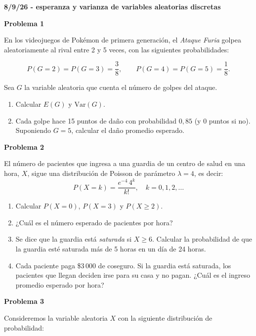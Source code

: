 \documentclass[12pt, a4paper]{article}
\begin{document}

\textbf{8/9/26 - esperanza y varianza de variables aleatorias discretas}

\textbf{Problema 1}

En los videojuegos de Pokémon de primera generación, el  \textit{Ataque Furia}
golpea aleatoriamente al rival entre 2 y 5 veces, con las siguientes probabilidades:

\[
  P(G = 2) = P(G = 3) = \frac{3}{8}, \qquad P(G = 4) = P(G = 5) = \frac{1}{8}.
\]

Sea $G$ la variable aleatoria que cuenta el número de golpes del ataque.

\begin{enumerate}[label=\alph*)]
  \item Calcular $E(G)$ y $\mathrm{Var}(G)$.
  \item Cada golpe hace 15 puntos de daño con probabilidad $0{,}85$
        (y 0 puntos si no). Suponiendo $G = 5$, calcular el daño promedio
        esperado.
\end{enumerate}

\vspace{1 cm}

\textbf{Problema 2}

El número de pacientes que ingresa a una guardia de un centro de salud en una hora,
$X$, sigue una distribución de Poisson de parámetro $\lambda = 4$, es decir:
\[
  P(X = k) = \frac{e^{-4}\,4^k}{k!}, \quad k = 0, 1, 2, \ldots
\]

\begin{enumerate}[label=\alph*)]
  \item Calcular $P(X=0)$, $P(X=3)$ y $P(X \geq 2)$.
  \item ¿Cuál es el número esperado de pacientes por hora?
  \item Se dice que la guardia está \emph{saturada} si $X \geq 6$.
        Calcular la probabilidad de que la guardia esté saturada
        más de 5 horas en un día de 24 horas.
  \item Cada paciente paga \$3\,000 de coseguro. Si la guardia está saturada,
        los pacientes que llegan deciden irse para su casa y no pagan.
        ¿Cuál es el ingreso promedio esperado por hora?
\end{enumerate}

\vspace{1 cm}

\textbf{Problema 3}

Consideremos la variable aleatoria $X$ con la siguiente distribución de probabilidad:
\end{document}
